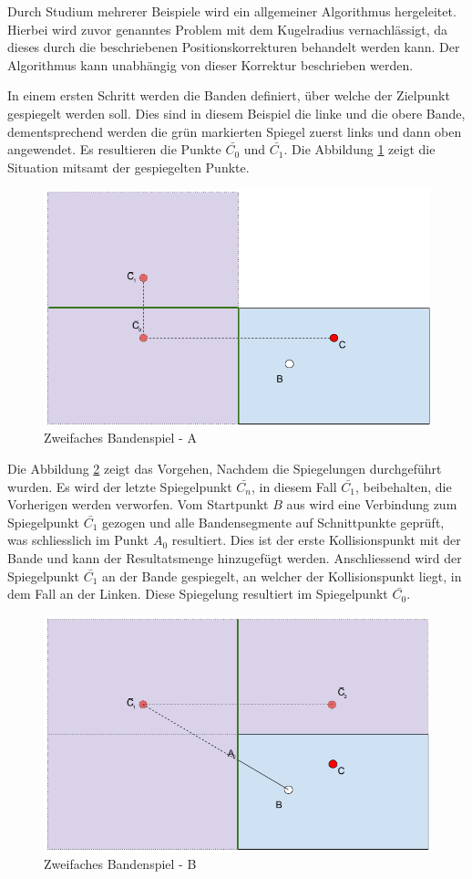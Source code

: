 Durch Studium mehrerer Beispiele wird ein allgemeiner Algorithmus hergeleitet. Hierbei wird zuvor genanntes Problem
mit dem Kugelradius vernachlässigt, da dieses durch die beschriebenen Positionskorrekturen behandelt werden kann.
Der Algorithmus kann unabhängig von dieser Korrektur beschrieben werden.

In einem ersten Schritt werden die Banden definiert, über welche der Zielpunkt gespiegelt werden soll. Dies sind in
diesem Beispiel die linke und die obere Bande, dementsprechend werden die grün markierten Spiegel zuerst links und
dann oben angewendet. Es resultieren die Punkte $\bar{C_0}$ und $\bar{C_1}$. Die Abbildung \ref{fig:zweifaches_bandenspiel_a} zeigt die
Situation mitsamt der gespiegelten Punkte.
\begin{figure}[h!]
    \begin{center}
        \includegraphics[width=0.5\linewidth]{../common/03_billiard_ai/resources/50_rail_reflection_2_a.png}
    \end{center}
    \caption{Zweifaches Bandenspiel - A}
    \label{fig:zweifaches_bandenspiel_a}
\end{figure}

Die Abbildung \ref{fig:zweifaches_bandenspiel_b} zeigt das Vorgehen, Nachdem die Spiegelungen durchgeführt wurden.
Es wird der letzte Spiegelpunkt $\bar{C_n}$, in diesem Fall $\bar{C_1}$,
beibehalten, die Vorherigen werden verworfen. Vom Startpunkt $B$ aus wird eine Verbindung zum Spiegelpunkt $\bar{C_1}$
gezogen und alle Bandensegmente auf Schnittpunkte geprüft, was schliesslich im Punkt $A_0$ resultiert. Dies ist
der erste Kollisionspunkt mit der Bande und kann der Resultatsmenge hinzugefügt werden. Anschliessend wird der Spiegelpunkt
$\bar{C_1}$ an der Bande gespiegelt, an welcher der Kollisionspunkt liegt, in dem Fall an der Linken. Diese Spiegelung
resultiert im Spiegelpunkt $\bar{C_0}$.
\begin{figure}[h!]
    \begin{center}
        \includegraphics[width=0.5\linewidth]{../common/03_billiard_ai/resources/51_rail_reflection_2_b.png}
    \end{center}
    \caption{Zweifaches Bandenspiel - B}
    \label{fig:zweifaches_bandenspiel_b}
\end{figure}

